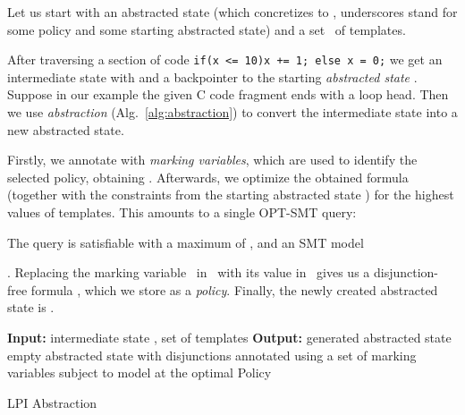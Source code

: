 \documentclass{llncs}
\begin{document}
\begin{example}
    Let us start with an abstracted state  (which
    concretizes to , underscores stand for some
    policy and some starting abstracted state) and a set~ of templates.

    After traversing a section of code
    \texttt{if(x <= 10){x += 1;} else {x = 0;}}
    we get an intermediate state  with
     and a backpointer
    to the starting \emph{abstracted state} .
    Suppose in our example the given C code fragment ends with a loop head.
    Then we use \emph{abstraction} (Alg.~\ref{alg:abstraction}) to convert the intermediate state
     into a new abstracted state.

    Firstly, we annotate  with \emph{marking variables}, which are used to
    identify the selected policy, obtaining .
    Afterwards, we optimize the obtained formula (together with the constraints
    from the starting abstracted state ) for the highest values of templates.
    This amounts to a single OPT-SMT query: 

    The query is satisfiable with a maximum of , and an SMT model
    
    \mbox{}.
    Replacing the marking variable~ in~ with its value
    in~ gives us a
    disjunction-free formula ,
    which we store as a \emph{policy}.
    Finally, the newly created abstracted state is .
\end{example}

\begin{algorithm}[t]
\begin{algorithmic}[1]
\State \textbf{Input: } intermediate state , set  of templates
\State \textbf{Output: } generated abstracted state 
\State  empty abstracted state
\ForAll{}
    \State  with disjunctions annotated using a set of
    marking variables 
    \State  subject to 
    \State  model at the optimal
    \State Policy 
    \State 
\EndFor
\Return 
\end{algorithmic}
\caption{LPI Abstraction}
\label{alg:abstraction}
\end{algorithm}
\end{document}
